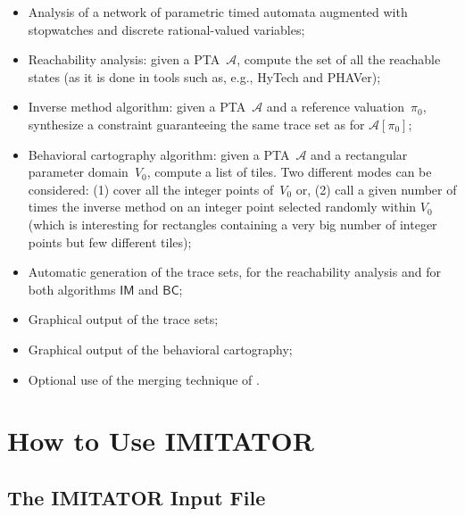 \documentclass[a4paper,11pt]{report}
\newcommand{\A}{\mathcal{A}}
\newcommand{\BC}{\ensuremath{\mathsf{BC}}}
\newcommand{\IM}{\ensuremath{\mathsf{IM}}}
\newcommand{\hytech}{{\sc HyTech}}
\newcommand{\imitator}{\textsf{IMITATOR}}
\newcommand{\phaver}{PHAVer}
\begin{document}
\begin{itemize}
	\item Analysis of a network of parametric timed automata augmented with stopwatches and discrete rational-valued variables;
	\item Reachability analysis: given a PTA~$\A$, compute the set of all the reachable states (as it is done in tools such as, e.g., \hytech{} and \phaver{});
	\item Inverse method algorithm: given a PTA~$\A$ and a reference valuation~$\pi_0$, synthesize a constraint guaranteeing the same trace set as for $\A[\pi_0]$;
	\item Behavioral cartography algorithm: given a PTA~$\A$ and a rectangular parameter domain~$V_0$, compute a list of tiles. Two different modes can be considered: (1) cover all the integer points of~$V_0$ or, (2) call a given number of times the inverse method on an integer point selected randomly within $V_0$ (which is interesting for rectangles containing a very big number of integer points but few different tiles);
	\item Automatic generation of the trace sets, for the reachability analysis and for both algorithms $\IM$ and $\BC$;
	\item Graphical output of the trace sets;
	\item Graphical output of the behavioral cartography;
	\item Optional use of the merging technique of \cite{AFS12}.
\end{itemize}







\chapter{How to Use \imitator{}} \label{sec:how}


\section{The \imitator{} Input File}
\end{document}
